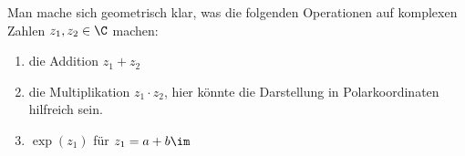 \begin{exercise}
  Man mache sich geometrisch klar, was die folgenden Operationen auf
  komplexen Zahlen $z_1, z_2 \in \C$ machen:
  \begin{enumerate}
  \item die Addition $z_1 + z_2$
  \item die Multiplikation $z_1 \cdot z_2$, hier könnte die Darstellung in
    Polarkoordinaten hilfreich sein.
  \item $\exp(z_1)$ für $z_1 = a + b \im$
  \end{enumerate}
\end{exercise}
